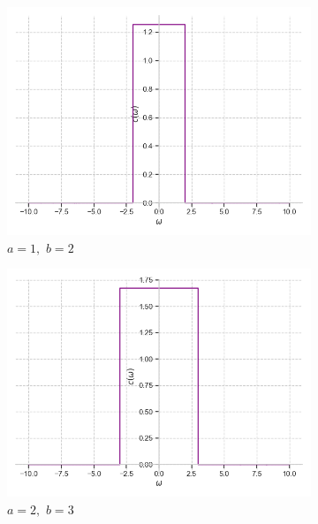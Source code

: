 \documentclass[a4paper, 16pt]{article}
\begin{document}
    \begin{figure}[htbp]
        \centering
        \begin{subfigure}{0.3\textwidth}
            \centering
            \includegraphics[width=\linewidth]{sincfimg_a=1_b=2.png}
            \caption{$a=1,\,\,b=2$}
            \label{fig:sincfimg_1}
        \end{subfigure}
        \hfill
        \begin{subfigure}{0.3\textwidth}
            \centering
            \includegraphics[width=\linewidth]{sincfimg_a=2_b=3.png}
            \caption{$a=2,\,\,b=3$}
            \label{fig:sincfimg_2}
        \end{subfigure}
        \hfill
        \begin{subfigure}{0.3\textwidth}

\end{subfigure}
\end{figure}
\end{document}
